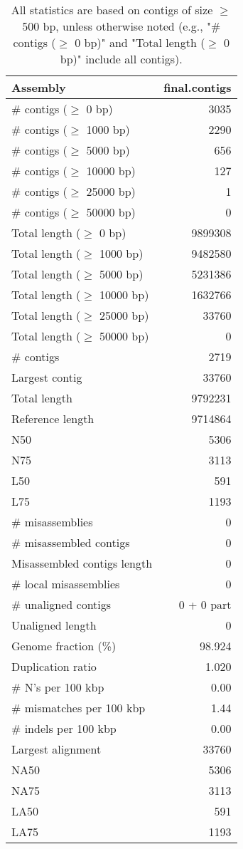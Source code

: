 \documentclass[12pt,a4paper]{article}
\begin{document}
\begin{table}[ht]
\begin{center}
\caption{All statistics are based on contigs of size $\geq$ 500 bp, unless otherwise noted (e.g., "\# contigs ($\geq$ 0 bp)" and "Total length ($\geq$ 0 bp)" include all contigs).}
\begin{tabular}{|l*{1}{|r}|}
\hline
Assembly & final.contigs \\ \hline
\# contigs ($\geq$ 0 bp) & 3035 \\ \hline
\# contigs ($\geq$ 1000 bp) & 2290 \\ \hline
\# contigs ($\geq$ 5000 bp) & 656 \\ \hline
\# contigs ($\geq$ 10000 bp) & 127 \\ \hline
\# contigs ($\geq$ 25000 bp) & 1 \\ \hline
\# contigs ($\geq$ 50000 bp) & 0 \\ \hline
Total length ($\geq$ 0 bp) & 9899308 \\ \hline
Total length ($\geq$ 1000 bp) & 9482580 \\ \hline
Total length ($\geq$ 5000 bp) & 5231386 \\ \hline
Total length ($\geq$ 10000 bp) & 1632766 \\ \hline
Total length ($\geq$ 25000 bp) & 33760 \\ \hline
Total length ($\geq$ 50000 bp) & 0 \\ \hline
\# contigs & 2719 \\ \hline
Largest contig & 33760 \\ \hline
Total length & 9792231 \\ \hline
Reference length & 9714864 \\ \hline
N50 & 5306 \\ \hline
N75 & 3113 \\ \hline
L50 & 591 \\ \hline
L75 & 1193 \\ \hline
\# misassemblies & 0 \\ \hline
\# misassembled contigs & 0 \\ \hline
Misassembled contigs length & 0 \\ \hline
\# local misassemblies & 0 \\ \hline
\# unaligned contigs & 0 + 0 part \\ \hline
Unaligned length & 0 \\ \hline
Genome fraction (\%) & 98.924 \\ \hline
Duplication ratio & 1.020 \\ \hline
\# N's per 100 kbp & 0.00 \\ \hline
\# mismatches per 100 kbp & 1.44 \\ \hline
\# indels per 100 kbp & 0.00 \\ \hline
Largest alignment & 33760 \\ \hline
NA50 & 5306 \\ \hline
NA75 & 3113 \\ \hline
LA50 & 591 \\ \hline
LA75 & 1193 \\ \hline
\end{tabular}
\end{center}
\end{table}
\end{document}
